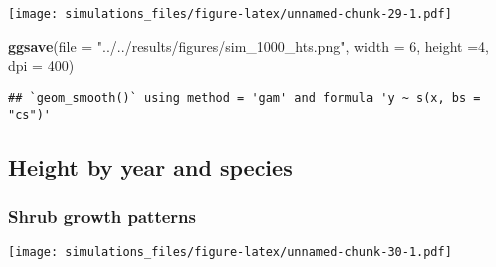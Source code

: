 \documentclass[]{article}
\newenvironment{Shaded}{\begin{snugshade}}{\end{snugshade}}
\newcommand{\KeywordTok}[1]{\textcolor[rgb]{0.13,0.29,0.53}{\textbf{#1}}}
\newcommand{\DataTypeTok}[1]{\textcolor[rgb]{0.13,0.29,0.53}{#1}}
\newcommand{\DecValTok}[1]{\textcolor[rgb]{0.00,0.00,0.81}{#1}}
\newcommand{\StringTok}[1]{\textcolor[rgb]{0.31,0.60,0.02}{#1}}
\newcommand{\OperatorTok}[1]{\textcolor[rgb]{0.81,0.36,0.00}{\textbf{#1}}}
\newcommand{\NormalTok}[1]{#1}
\begin{document}
\texttt{[image: simulations\_files/figure-latex/unnamed-chunk-29-1.pdf]}

\begin{Shaded}
\begin{Highlighting}[]
\KeywordTok{ggsave}\NormalTok{(}\DataTypeTok{file =} \StringTok{"../../results/figures/sim_1000_hts.png"}\NormalTok{, }\DataTypeTok{width =} \DecValTok{6}\NormalTok{, }\DataTypeTok{height =}\DecValTok{4}\NormalTok{, }\DataTypeTok{dpi =} \DecValTok{400}\NormalTok{)}
\end{Highlighting}
\end{Shaded}

\begin{verbatim}
## `geom_smooth()` using method = 'gam' and formula 'y ~ s(x, bs = "cs")'
\end{verbatim}

\subsection{Height by year and
species}\label{height-by-year-and-species}

\subsubsection{Shrub growth patterns}\label{shrub-growth-patterns-1}

\begin{Shaded}
\end{Shaded}

\texttt{[image: simulations\_files/figure-latex/unnamed-chunk-30-1.pdf]}

\begin{Shaded}
\end{Shaded}
\end{document}
